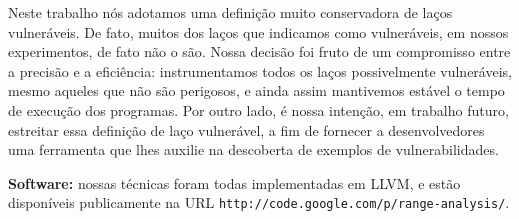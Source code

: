 \documentclass{llncs}
\begin{document}
Neste trabalho nós adotamos uma definição muito conservadora de laços
vulneráveis.
De fato, muitos dos laços que indicamos como vulneráveis, em nossos
experimentos, de fato não o são.
Nossa decisão foi fruto de um compromisso entre a precisão e a eficiência:
instrumentamos todos os laços possivelmente vulneráveis, mesmo aqueles que
não são perigosos, e ainda assim mantivemos estável o tempo de execução dos
programas.
Por outro lado, é nossa intenção, em trabalho futuro, estreitar essa definição
de laço vulnerável, a fim de fornecer a desenvolvedores uma ferramenta que lhes
auxilie na descoberta de exemplos de vulnerabilidades.

\noindent
\textbf{Software: } nossas técnicas foram todas implementadas em LLVM, e estão
disponíveis publicamente na URL \texttt{http://code.google.com/p/range-analysis/}.



\end{document}
